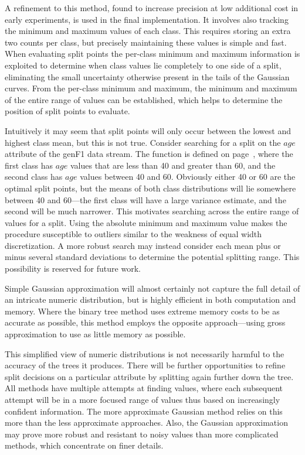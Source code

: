 A refinement to this method, found to increase precision at low additional cost in early experiments, is used in the final implementation. It involves also tracking the minimum and maximum values of each class. This requires storing an extra two counts per class, but precisely maintaining these values is simple and fast. When evaluating split points the per-class minimum and maximum information is exploited to determine when class values lie completely to one side of a split, eliminating the small uncertainty otherwise present in the tails of the Gaussian curves. From the per-class minimum and maximum, the minimum and maximum of the entire range of values can be established, which helps to determine the position of split points to evaluate.

Intuitively it may seem that split points will only occur between the lowest and highest class mean, but this is not true. Consider searching for a split on the $age$ attribute of the {\sc genF1} data stream. The function is defined on page~\pageref{fig:agrawalFuncs1}, where the first class has $age$ values that are less than 40 and greater than 60, and the second class has $age$ values between 40 and 60. Obviously either 40 or 60 are the optimal split points, but the means of both class distributions will lie somewhere between 40 and 60---the first class will have a large variance estimate, and the second will be much narrower. This motivates searching across the entire range of values for a split. Using the absolute minimum and maximum value makes the procedure susceptible to outliers similar to the weakness of equal width discretization. A more robust search may instead consider each mean plus or minus several standard deviations to determine the potential splitting range. This possibility is reserved for future work.

Simple Gaussian approximation will almost certainly not capture the full detail of an intricate numeric distribution, but is highly efficient in both computation and memory. Where the binary tree method uses extreme memory costs to be as accurate as possible, this method employs the opposite approach---using gross approximation to use as little memory as possible.

This simplified view of numeric distributions is not necessarily harmful to the accuracy of the trees it produces. There will be further opportunities to refine split decisions on a particular attribute by splitting again further down the tree.
All methods have multiple attempts at finding values,
where each subsequent attempt will be in a more focused range of values thus based on increasingly confident information.
The more approximate Gaussian method relies on this more than the less
approximate approaches. Also, the Gaussian approximation
may prove more robust and resistant to noisy values than more complicated methods, which concentrate on finer details.

